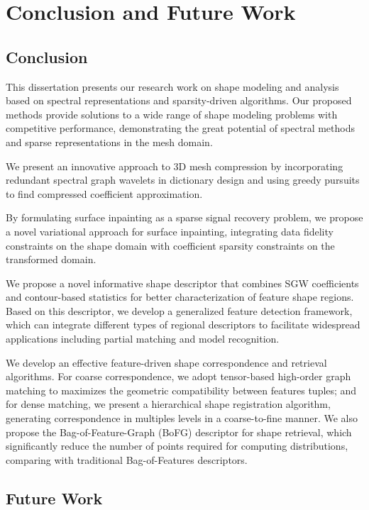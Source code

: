 \chapter{Conclusion and Future Work}
\label{chap:conclusion}

\section{Conclusion}
This dissertation presents our research work on shape modeling and
analysis based on spectral representations and sparsity-driven algorithms.
Our proposed methods provide solutions to a wide range of shape modeling
problems with competitive performance, demonstrating the great potential
of spectral methods and sparse representations in the mesh domain.

We present an innovative approach to 3D mesh compression
by incorporating redundant spectral graph wavelets in dictionary design and using
greedy pursuits to find compressed coefficient approximation.

By formulating surface inpainting as a sparse signal recovery problem,
we propose a novel variational approach for surface inpainting, integrating data fidelity
constraints on the shape domain with coefficient sparsity constraints on the
transformed domain.

We propose a novel informative shape descriptor that combines SGW coefficients and
contour-based statistics for better characterization of feature shape regions. Based on
this descriptor, we develop a generalized feature detection framework, which can integrate different
types of regional descriptors to facilitate widespread applications including partial matching and
model recognition.

We develop an effective feature-driven shape correspondence and retrieval
algorithms. For coarse correspondence, we adopt
tensor-based high-order graph matching to maximizes the
geometric compatibility between features tuples; and for dense matching,
we present a hierarchical shape registration algorithm, generating
correspondence in multiples levels in a coarse-to-fine manner. 
We also propose the Bag-of-Feature-Graph (BoFG) descriptor for shape retrieval, 
which significantly reduce the number of points required for computing 
distributions, comparing with traditional Bag-of-Features descriptors.

\section{Future Work}

